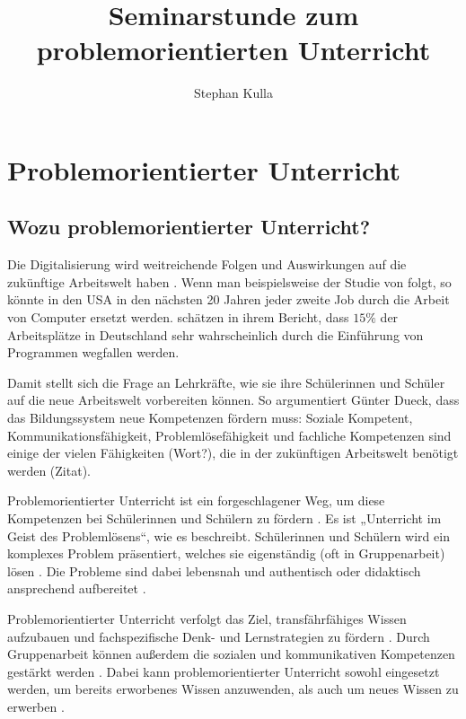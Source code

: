 \documentclass[man,12pt,a4paper]{apa6}
\title{Seminarstunde zum problemorientierten Unterricht}
\author{Stephan Kulla}
\affiliation{TU München}
\begin{document}
\thispagestyle{otherpage}

\maketitle

\section{Problemorientierter Unterricht}

\subsection{Wozu problemorientierter Unterricht?}

Die Digitalisierung wird weitreichende Folgen und Auswirkungen auf die zukünftige Arbeitswelt haben \parencite{dengler2015}. Wenn man beispielsweise der Studie von \textcite{frey2017} folgt, so könnte in den USA in den nächsten 20 Jahren jeder zweite Job durch die Arbeit von Computer ersetzt werden. \textcite{dengler2015} schätzen in ihrem Bericht, dass $15\%$ der Arbeitsplätze in Deutschland sehr wahrscheinlich durch die Einführung von Programmen wegfallen werden.

Damit stellt sich die Frage an Lehrkräfte, wie sie ihre Schülerinnen und Schüler auf die neue Arbeitswelt vorbereiten können. So argumentiert Günter Dueck, dass das Bildungssystem neue Kompetenzen fördern muss: Soziale Kompetent, Kommunikationsfähigkeit, Problemlösefähigkeit und fachliche Kompetenzen sind einige der vielen Fähigkeiten (Wort?), die in der zukünftigen Arbeitswelt benötigt werden (Zitat).

Problemorientierter Unterricht ist ein forgeschlagener Weg, um diese Kompetenzen bei Schülerinnen und Schülern zu fördern \parencite{silver2004}. Es ist „Unterricht im Geist des Problemlösens“, wie \textcite{reusser2005} es beschreibt. Schülerinnen und Schülern wird ein komplexes Problem präsentiert, welches sie eigenständig (oft in Gruppenarbeit) lösen \parencite{silver2004}. Die Probleme sind dabei lebensnah und authentisch \parencite{kunter2013} oder didaktisch ansprechend aufbereitet \parencite{reusser2005}.

Problemorientierter Unterricht verfolgt das Ziel, transfährfähiges Wissen aufzubauen und fachspezifische Denk- und Lernstrategien zu fördern \parencite{reusser2005}. Durch Gruppenarbeit können außerdem die sozialen und kommunikativen Kompetenzen gestärkt werden \parencite{seidel2014}. Dabei kann problemorientierter Unterricht sowohl eingesetzt werden, um bereits erworbenes Wissen anzuwenden, als auch um neues Wissen zu erwerben \parencite{reusser2005}.
\end{document}
